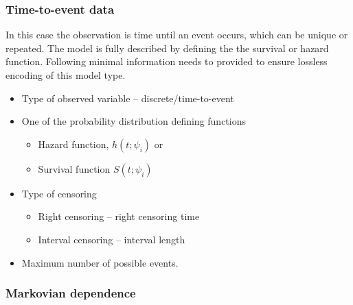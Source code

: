 \subsubsection{Time-to-event data}
In this case the observation is time until an event occurs, which can be unique or repeated.
The model is fully described by defining the the survival or hazard function. Following minimal information 
needs to provided to ensure lossless encoding of this model type.
\begin{itemize}
\item
Type of observed variable -- discrete/time-to-event
\item
One of the probability distribution defining functions
\begin{itemize}
\item
Hazard function, $h(t; \psi_i)$ or
\item
Survival function $S(t;\psi_i)$
\end{itemize}
\item
Type of censoring
\begin{itemize}
\item
Right censoring -- right censoring time 
\item
Interval censoring -- interval length
\end{itemize}
\item
Maximum number of possible events.
\end{itemize}


\subsubsection{Markovian dependence}
\label{subsec:markovian}

%

